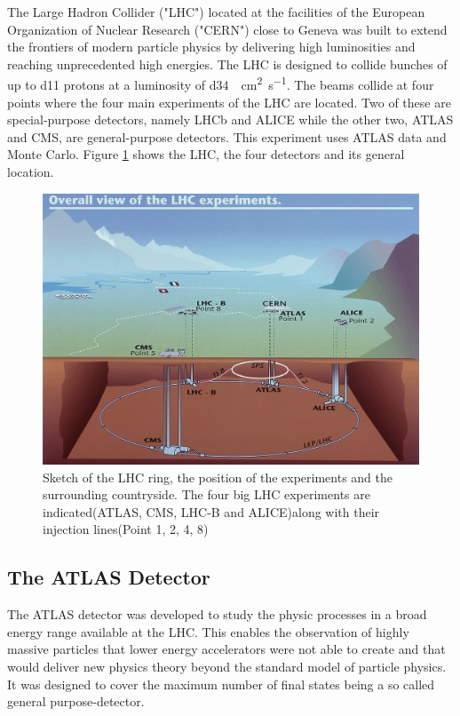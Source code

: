 The Large Hadron Collider ("LHC") located at the facilities of the European Organization of Nuclear Research ("CERN") close to Geneva was built to extend the frontiers of modern particle physics by delivering high luminosities and reaching unprecedented high energies.
The LHC is designed to collide bunches of up to \num{d11} protons at a luminosity of \SI{d34}{\per\square\cm \per\s}. The beams collide at four points where the four main experiments of the LHC are located. Two of these are special-purpose detectors, namely LHCb and ALICE while the other two, ATLAS and CMS, are general-purpose detectors.
This experiment uses ATLAS data and Monte Carlo.
Figure \ref{fig:LHC} shows the LHC, the four detectors and its general location.
\begin{figure}
  \centering
  \includegraphics[scale=0.4]{figures_LHC/CERN-all-experiments.jpg}
  \caption[Sketch of the LHC ring.]{Sketch of the LHC ring, the position
    of the experiments and the surrounding countryside. The four big
    LHC experiments are indicated(ATLAS, CMS, LHC-B and ALICE)along with their injection lines(Point 1, 2, 4, 8)\cite{atlas_pictures}}
  \label{fig:LHC}
\end{figure}


\subsection{The ATLAS Detector}

The ATLAS detector was developed to study the physic processes in a broad energy range available at the LHC. This enables the observation of highly massive particles that lower energy accelerators were not able to create and that would deliver new physics theory beyond the standard model of particle physics.
It was designed to cover the maximum number of final states being a so called general purpose-detector.

